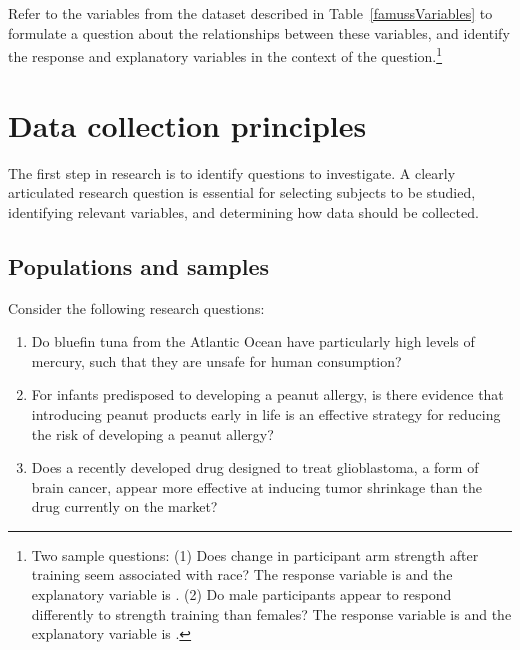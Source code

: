 \begin{exercise}
Refer to the variables from the  dataset described in Table~\ref{famussVariables} to formulate a question about the relationships between these variables, and identify the response and explanatory variables in the context of the question.\footnote{Two sample questions: (1)  Does change in participant arm strength after training seem associated with race? The response variable is  and the explanatory variable is . (2)  Do male participants appear to respond differently to strength training than females? The response variable is  and the explanatory variable is .}
\end{exercise}



\section{Data collection principles}
\label{dataCollectionPrinciples}


The first step in research is to identify questions to investigate. A clearly articulated research question is essential for selecting subjects to be studied, identifying relevant variables, and determining how data should be collected.

\subsection{Populations and samples}
\label{populationsAndSamples}

Consider the following research questions:

\begin{enumerate}
\setlength{\itemsep}{0mm}

\item Do bluefin tuna from the Atlantic Ocean have particularly high levels of mercury, such that they are unsafe for human consumption?

\item For infants predisposed to developing a peanut allergy, is there evidence that introducing peanut products early in life is an effective strategy for reducing the risk of developing a peanut allergy?

\item Does a recently developed drug designed to treat glioblastoma, a form of brain cancer, appear more effective at inducing tumor shrinkage than the drug currently on the market?
\end{enumerate}

